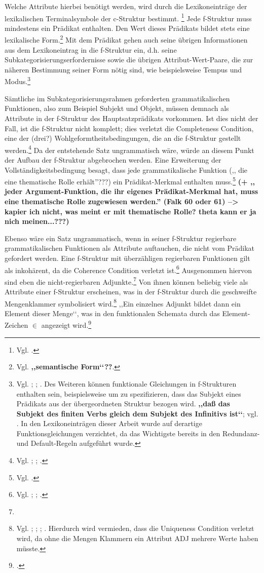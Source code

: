 \documentclass[12pt,a4paper]{article}
\begin{document}
Welche Attribute hierbei benötigt werden, wird durch die Lexikoneinträge der lexikalischen Terminalsymbole der c-Struktur bestimmt. \footnote{Vgl. \cite[13; 23]{Rohrer}.} Jede f-Struktur muss mindestens ein Prädikat enthalten. Den Wert dieses Prädikats bildet stets eine lexikalische Form.\footnote{Vgl. \cite[8]{Skript} \textbf{,,semantische Form‘‘??}.} Mit dem Prädikat gehen auch seine übrigen Informationen aus dem Lexikoneintrag in die f-Struktur ein, d.h. seine Subkategorisierungserfordernisse sowie die übrigen Attribut-Wert-Paare, die zur näheren Bestimmung seiner Form nötig sind, wie beispielsweise Tempus und Modus.\footnote{Vgl. \cite[23; 28-9]{Rohrer}; \cite[7; 9]{Skript}; \cite[7]{Dal}. Des Weiteren können funktionale Gleichungen in f-Strukturen enthalten sein, beispielsweise um zu spezifizieren, dass das Subjekt eines Prädikats aus der übergeordneten Struktur bezogen wird. \textbf{,,daß das Subjekt des finiten Verbs gleich dem Subjekt des Infinitivs ist‘‘}; vgl. \cite[21]{Rohrer}. In den Lexikoneinträgen dieser Arbeit wurde auf derartige Funktionsgleichungen verzichtet, da das Wichtigste bereits in den Redundanz- und Default-Regeln aufgeführt wurde.} 

Sämtliche im Subkategorisierungsrahmen geforderten grammatikalischen Funktionen, also zum Beispiel Subjekt und Objekt, müssen demnach als Attribute in der f-Struktur des Hauptsatzprädikats vorkommen. Ist dies nicht der Fall, ist die f-Struktur nicht komplett; dies verletzt die Completeness Condition, eine der (drei?) Wohlgeformtheitsbedingungen, die an die f-Struktur gestellt werden.\footnote{Vgl. \cite[58-9]{Falk}; \cite[28]{Rohrer}; \cite[19-20]{Skript}.} Da der entstehende Satz ungrammatisch wäre, würde an diesem Punkt der Aufbau der f-Struktur abgebrochen werden. Eine Erweiterung der Vollständigkeitsbedingung besagt, dass jede grammatikalische Funktion (,, die eine thematische Rolle erhält''???) ein Prädikat-Merkmal enthalten muss.\footnote{Vgl. \cite[61]{Falk}.}
\textbf{(+ ,, jeder Argument-Funktion, die ihr eigenes Prädikat-Merkmal hat, muss eine thematische Rolle zugewiesen werden.'' (Falk 60 oder 61) --> kapier ich nicht, was meint er mit thematische Rolle? theta kann er ja nich meinen...???)}

Ebenso wäre ein Satz ungrammatisch, wenn in seiner f-Struktur regierbare grammatikalischen Funktionen als Attribute auftauchen, die nicht vom Prädikat gefordert werden. Eine f-Struktur mit überzähligen regierbaren Funktionen gilt als inkohärent, da die Coherence Condition verletzt ist.\footnote{Vgl. \cite[59-62]{Falk}; \cite[29; 39]{Rohrer}; \cite[20]{Skript}.} Ausgenommen hiervon sind eben die nicht-regierbaren Adjunkte.\footnote{} Von ihnen können beliebig viele als Attribute einer f-Struktur erscheinen, was in der f-Struktur durch die geschweifte Mengenklammer symbolisiert wird.\footnote{Vgl. \cite[61; 72]{Falk}; \cite[12]{Dal}; \cite[28]{Rohrer}; \cite[38-40]{Skript}. Hierdurch wird vermieden, dass die Uniqueness Condition verletzt wird, da ohne die Mengen Klammern ein Attribut ADJ mehrere Werte haben müsste.} ,,Ein einzelnes Adjunkt bildet dann ein Element dieser Menge‘‘, was in den funktionalen Schemata durch das Element-Zeichen $\in$ angezeigt wird.\footnote{ \cite[39]{Skript}.}
\end{document}

